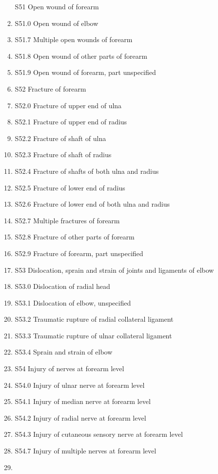 \documentclass[
]{scrartcl}
\begin{document}
\begin{itemize}
\begin{enumerate}
    S51 Open wound of forearm
  \item
    S51.0 Open wound of elbow
  \item
    S51.7 Multiple open wounds of forearm
  \item
    S51.8 Open wound of other parts of forearm
  \item
    S51.9 Open wound of forearm, part unspecified
  \item
    S52 Fracture of forearm
  \item
    S52.0 Fracture of upper end of ulna
  \item
    S52.1 Fracture of upper end of radius
  \item
    S52.2 Fracture of shaft of ulna
  \item
    S52.3 Fracture of shaft of radius
  \item
    S52.4 Fracture of shafts of both ulna and radius
  \item
    S52.5 Fracture of lower end of radius
  \item
    S52.6 Fracture of lower end of both ulna and radius
  \item
    S52.7 Multiple fractures of forearm
  \item
    S52.8 Fracture of other parts of forearm
  \item
    S52.9 Fracture of forearm, part unspecified
  \item
    S53 Dislocation, sprain and strain of joints and ligaments of elbow
  \item
    S53.0 Dislocation of radial head
  \item
    S53.1 Dislocation of elbow, unspecified
  \item
    S53.2 Traumatic rupture of radial collateral ligament
  \item
    S53.3 Traumatic rupture of ulnar collateral ligament
  \item
    S53.4 Sprain and strain of elbow
  \item
    S54 Injury of nerves at forearm level
  \item
    S54.0 Injury of ulnar nerve at forearm level
  \item
    S54.1 Injury of median nerve at forearm level
  \item
    S54.2 Injury of radial nerve at forearm level
  \item
    S54.3 Injury of cutaneous sensory nerve at forearm level
  \item
    S54.7 Injury of multiple nerves at forearm level
  \item

\end{enumerate}
\end{itemize}
\end{document}
